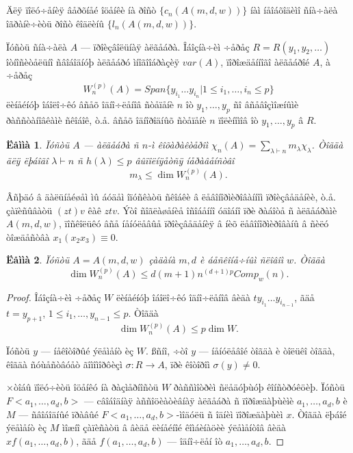 \documentclass{article}
\numberwithin{equation}{section}
\theoremstyle{plain}
\newtheorem{lemma}{Ëåììà}[section]
\theoremstyle{definition}
\newtheorem{proof}{Äîêàçàòåëüñòâî}
\begin{document}
\begin{fulltext}
 

\subsection{}\label{s3.2}
Äëÿ ïîëó÷åíèÿ âåðõíåé îöåíêè íà ðîñò $\{c_n(A(m,d,w)) \}$ íàì íåîáõîäèìî ñíà÷àëà îãðàíè÷èòü
ðîñò êîäëèíû $\{l_n(A(m,d,w)) \}$.

Ïóñòü ñíà÷àëà $A$ --- ïðîèçâîëüíàÿ àëãåáðà. Îáîçíà÷èì ÷åðåç $R=R(y_1,y_2,\ldots)$
îòíîñèòåëüíî ñâîáîäíóþ àëãåáðó ìíîãîîáðàçèÿ $var(A)$, ïîðîæäåííîãî àëãåáðîé $A$, à ÷åðåç
$$
W_n^{(p)}(A)=Span\{y_{i_1}\ldots y_{i_n}|1\le i_1,\ldots,i_n\le p\}
$$
ëèíåéíóþ îáîëî÷êó âñåõ îäíî÷ëåíîâ ñòåïåíè $n$ îò $y_{1},\ldots, y_{p}$ ñî âñåâîçìîæíûìè
ðàññòàíîâêàìè ñêîáîê, ò.å. âñåõ îäíîðîäíûõ ñòåïåíè $n$ ïîëèíîìîâ îò $y_{1},\ldots, y_{p}$
â $R$.

\begin{lemma}\label{L5} \cite[ëåììà 4.1]{GMZ}
Ïóñòü $A$ --- àëãåáðà ñ $n$-ì êîõàðàêòåðîì 
$\chi_n(A)=\sum_{\lambda\vdash n} m_\lambda\chi_\lambda$. Òîãäà äëÿ ëþáîãî $\lambda\vdash n$
ñ $h(\lambda)\le p$ âûïîëíÿåòñÿ íåðàâåíñòâî
\begin{equation}\label{e7}
m_\lambda\le \dim W_n^{(p)}(A).
\end{equation}
\end{lemma}

Âñþäó  â äàëüíåéøåì ìû áóäåì îïóñêàòü ñêîáêè â ëåâîíîðìèðîâàííîì ïðîèçâåäåíèè, ò.å.
çàïèñûâàòü $(zt)v$ êàê $ztv$. Ýòî ñîãëàøåíèå îñîáåííî óäîáíî ïðè ðàáîòå ñ àëãåáðàìè
$A(m,d,w)$, ïîñêîëüêó âñå íåíóëåâûå ïðîèçâåäåíèÿ â íèõ ëåâîíîðìèðîâàíû â ñèëó òîæäåñòâà 
$x_1(x_2x_3)\equiv 0$.

\begin{lemma}\label{L6} 
Ïóñòü $A=A(m,d,w)$ çàäàíà $m,d$ è áåñêîíå÷íûì ñëîâîì $w$. Òîãäà
$$
\dim W_n^{(p)}(A) \le d(m+1)n^{(d+1)p} Comp_w(n).
$$ 
\end{lemma}

\begin{proof}
Îáîçíà÷èì ÷åðåç $W$ ëèíåéíóþ îáîëî÷êó îäíî÷ëåíîâ âèäà $ty_{i_1}\ldots y_{i_{n-1}}$, ãäå
$t=y_{p+1}$, $1\le i_1,\ldots, y_{n-1}\le p$. Òîãäà
$$
\dim W_n^{(p)}(A) \le p\dim W.
$$

Ïóñòü $y$ --- íåêîòîðûé ýëåìåíò èç $W$. ßñíî, ÷òî $y$ --- íåíóëåâîé òîãäà è òîëüêî òîãäà,
êîãäà ñóùåñòâóåò ãîìîìîðôèçì $\sigma: R\to A$, ïðè êîòîðîì $\sigma(y)\ne 0$.

×òîáû ïîëó÷èòü îöåíêó íà ðàçìåðíîñòü $W$ ðàññìîòðèì ñëåäóþùóþ êîíñòðóêöèþ. Ïóñòü
$F<a_1,\ldots, a_d,b>$ --- câîáîäíàÿ àññîöèàòèâíàÿ àëãåáðà ñ ïîðîæäàþùèìè
$a_1,\ldots, a_d,b$ è $M$ --- ñâîáîäíûé ïðàâûé $F<a_1,\ldots, a_d,b>$-ìîäóëü ñ
îäíèì ïîðîæäàþùèì $x$. Òîãäà ëþáîé ýëåìåíò èç $M$ ìîæíî çàïèñàòü â âèäå ëèíåéíîé êîìáèíàöèè ýëåìåíòîâ âèäà $xf(a_1,\ldots, a_d,b)$, ãäå $f(a_1,\ldots, a_d,b)$ --- îäíî÷ëåí îò
$a_1,\ldots, a_d,b$. 


\end{proof}
\end{fulltext}
\end{document}
